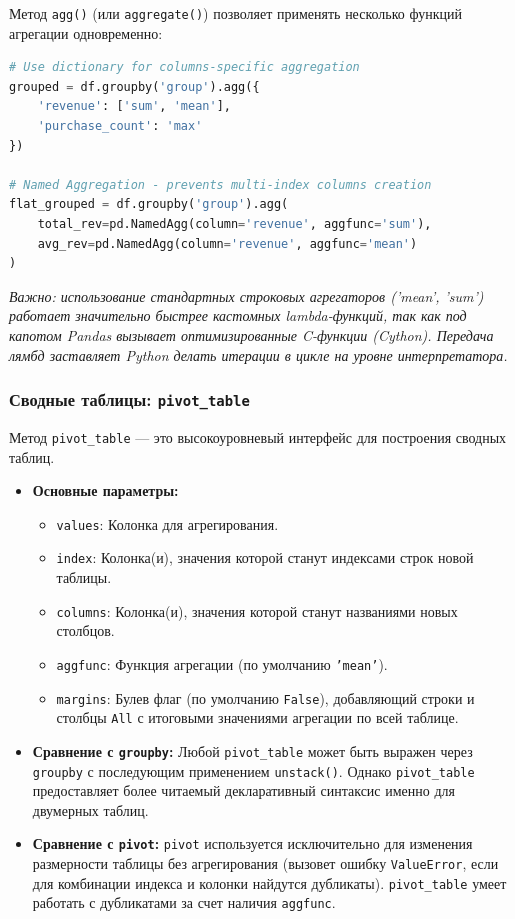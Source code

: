 \documentclass[12pt]{article}
\newcommand{\commentary}[1]{{\small\itshape\color{commentgray} #1}}
\begin{document}
Метод \texttt{agg()} (или \texttt{aggregate()}) позволяет применять несколько функций агрегации одновременно:
\begin{lstlisting}[language=Python, caption={Применение groupby и agg}]
# Use dictionary for columns-specific aggregation
grouped = df.groupby('group').agg({
    'revenue': ['sum', 'mean'],
    'purchase_count': 'max'
})

# Named Aggregation - prevents multi-index columns creation
flat_grouped = df.groupby('group').agg(
    total_rev=pd.NamedAgg(column='revenue', aggfunc='sum'),
    avg_rev=pd.NamedAgg(column='revenue', aggfunc='mean')
)
\end{lstlisting}

\commentary{Важно: использование стандартных строковых агрегаторов ('mean', 'sum') работает значительно быстрее кастомных lambda-функций, так как под капотом Pandas вызывает оптимизированные C-функции (Cython). Передача лямбд заставляет Python делать итерации в цикле на уровне интерпретатора.}

\subsubsection{Сводные таблицы: \texttt{pivot\_table}}

Метод \texttt{pivot\_table} --- это высокоуровневый интерфейс для построения сводных таблиц.
\begin{itemize}
    \item \textbf{Основные параметры:}
    \begin{itemize}
        \item \texttt{values}: Колонка для агрегирования.
        \item \texttt{index}: Колонка(и), значения которой станут индексами строк новой таблицы.
        \item \texttt{columns}: Колонка(и), значения которой станут названиями новых столбцов.
        \item \texttt{aggfunc}: Функция агрегации (по умолчанию \texttt{'mean'}).
        \item \texttt{margins}: Булев флаг (по умолчанию \texttt{False}), добавляющий строки и столбцы \texttt{All} с итоговыми значениями агрегации по всей таблице.
    \end{itemize}
    \item \textbf{Сравнение с \texttt{groupby}:} Любой \texttt{pivot\_table} может быть выражен через \texttt{groupby} с последующим применением \texttt{unstack()}. Однако \texttt{pivot\_table} предоставляет более читаемый декларативный синтаксис именно для двумерных таблиц.
    \item \textbf{Сравнение с \texttt{pivot}:} \texttt{pivot} используется исключительно для изменения размерности таблицы без агрегирования (вызовет ошибку \texttt{ValueError}, если для комбинации индекса и колонки найдутся дубликаты). \texttt{pivot\_table} умеет работать с дубликатами за счет наличия \texttt{aggfunc}.
\end{itemize}
\end{document}
